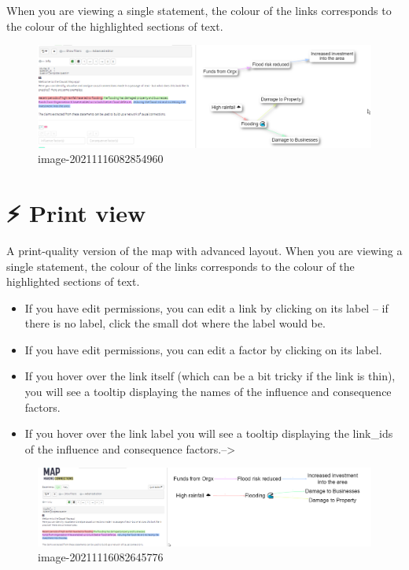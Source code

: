 \documentclass[
]{book}
\begin{document}
When you are viewing a single statement, the colour of the links corresponds to the colour of the highlighted sections of text.

\begin{figure}
\centering
\includegraphics{_assets/image-20211116082854960.png}
\caption{image-20211116082854960}
\end{figure}

\hypertarget{print-view}{%
\chapter{⚡ Print view}\label{print-view}}

A print-quality version of the map with advanced layout. When you are viewing a single statement, the colour of the links corresponds to the colour of the highlighted sections of text.

\begin{itemize}
\item
  If you have edit permissions, you can edit a link by clicking on its label -- if there is no label, click the small dot where the label would be.
\item
  If you have edit permissions, you can edit a factor by clicking on its label.
\item
  If you hover over the link itself (which can be a bit tricky if the link is thin), you will see a tooltip displaying the names of the influence and consequence factors.
\item
  If you hover over the link label you will see a tooltip displaying the link\_ids of the influence and consequence factors.--\textgreater{}
\end{itemize}

\begin{figure}
\centering
\includegraphics{_assets/image-20211116082645776.png}
\caption{image-20211116082645776}
\end{figure}
\end{document}
